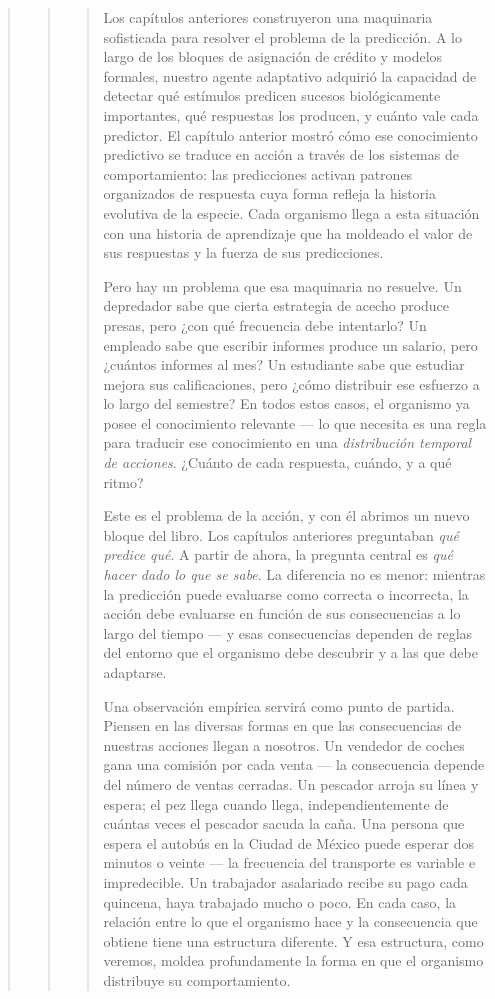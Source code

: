 \documentclass[
  letterpaper,
  DIV=11,
  numbers=noendperiod]{scrreprt}
\begin{document}
\begin{tcolorbox}[enhanced jigsaw, toprule=.15mm, arc=.35mm, colback=white, opacityback=0, colframe=quarto-callout-note-color-frame, breakable, rightrule=.15mm, left=2mm, leftrule=.75mm, bottomrule=.15mm]
\begin{quote}
\begin{quote}
\begin{quote}
Los capítulos anteriores construyeron una maquinaria sofisticada para
resolver el problema de la predicción. A lo largo de los bloques de
asignación de crédito y modelos formales, nuestro agente adaptativo
adquirió la capacidad de detectar qué estímulos predicen sucesos
biológicamente importantes, qué respuestas los producen, y cuánto vale
cada predictor. El capítulo anterior mostró cómo ese conocimiento
predictivo se traduce en acción a través de los sistemas de
comportamiento: las predicciones activan patrones organizados de
respuesta cuya forma refleja la historia evolutiva de la especie. Cada
organismo llega a esta situación con una historia de aprendizaje que ha
moldeado el valor de sus respuestas y la fuerza de sus predicciones.

Pero hay un problema que esa maquinaria no resuelve. Un depredador sabe
que cierta estrategia de acecho produce presas, pero ¿con qué frecuencia
debe intentarlo? Un empleado sabe que escribir informes produce un
salario, pero ¿cuántos informes al mes? Un estudiante sabe que estudiar
mejora sus calificaciones, pero ¿cómo distribuir ese esfuerzo a lo largo
del semestre? En todos estos casos, el organismo ya posee el
conocimiento relevante --- lo que necesita es una regla para traducir
ese conocimiento en una \emph{distribución temporal de acciones}.
¿Cuánto de cada respuesta, cuándo, y a qué ritmo?

Este es el problema de la acción, y con él abrimos un nuevo bloque del
libro. Los capítulos anteriores preguntaban \emph{qué predice qué}. A
partir de ahora, la pregunta central es \emph{qué hacer dado lo que se
sabe}. La diferencia no es menor: mientras la predicción puede evaluarse
como correcta o incorrecta, la acción debe evaluarse en función de sus
consecuencias a lo largo del tiempo --- y esas consecuencias dependen de
reglas del entorno que el organismo debe descubrir y a las que debe
adaptarse.

Una observación empírica servirá como punto de partida. Piensen en las
diversas formas en que las consecuencias de nuestras acciones llegan a
nosotros. Un vendedor de coches gana una comisión por cada venta --- la
consecuencia depende del número de ventas cerradas. Un pescador arroja
su línea y espera; el pez llega cuando llega, independientemente de
cuántas veces el pescador sacuda la caña. Una persona que espera el
autobús en la Ciudad de México puede esperar dos minutos o veinte --- la
frecuencia del transporte es variable e impredecible. Un trabajador
asalariado recibe su pago cada quincena, haya trabajado mucho o poco. En
cada caso, la relación entre lo que el organismo hace y la consecuencia
que obtiene tiene una estructura diferente. Y esa estructura, como
veremos, moldea profundamente la forma en que el organismo distribuye su
comportamiento.


\end{quote}
\end{quote}
\end{quote}
\end{tcolorbox}
\end{document}
